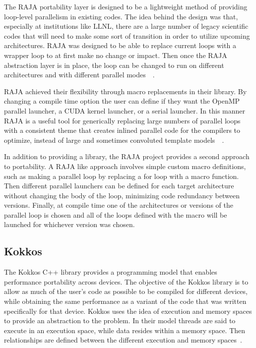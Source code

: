 The RAJA portability layer is designed to be a lightweight method of providing loop-level parallelism in existing codes.
%
The idea behind the design was that, especially at institutions like LLNL, there are a large number of legacy scientific codes that will need to make some sort of transition in order to utilize upcoming architectures.
%
RAJA was designed to be able to replace current loops with a wrapper loop to at first make no change or impact. 
%
Then once the RAJA abstraction layer is in place, the loop can be changed to run on different architectures  and with different parallel modes~\cite{hornung2014raja}~\cite{hornung2016raja}.

RAJA achieved their flexibility through macro replacements in their library.
%
By changing a compile time option the user can define if they want the OpenMP parallel launcher, a CUDA kernel launcher, or a serial launcher.
%
In this manner RAJA is a useful tool for generically replacing large numbers of parallel loops with a consistent theme that creates inlined parallel code for the compilers to optimize, instead of large and sometimes convoluted template models~\cite{hornung2014raja}~\cite{hornung2016raja}.

In addition to providing a library, the RAJA project provides a second approach to portability.
%
A RAJA like approach involves simple custom macro definitions, such as making a parallel loop by replacing a for loop with a macro function.
%
Then different parallel launchers can be defined for each target architecture without changing the body of the loop, minimizing code redundancy between versions.
%
Finally, at compile time one of the architectures or versions of the parallel loop is chosen and all of the loops defined with the macro will be launched for whichever version was chosen.

\subsection*{\textbf{Kokkos}}

The Kokkos C++ library provides a programming model that enables performance portability across devices.
%
The objective of the Kokkos library is to allow as much of the user's code as possible to be compiled for different devices, while obtaining the same performance as a variant of the code that was written specifically for that device.
%
Kokkos uses the idea of execution and memory spaces to provide an abstraction to the problem.
%
In their model threads are said to execute in an execution space, while data resides within a memory space.
%
Then relationships are defined between the different execution and memory spaces~\cite{edwards2014kokkos}.

